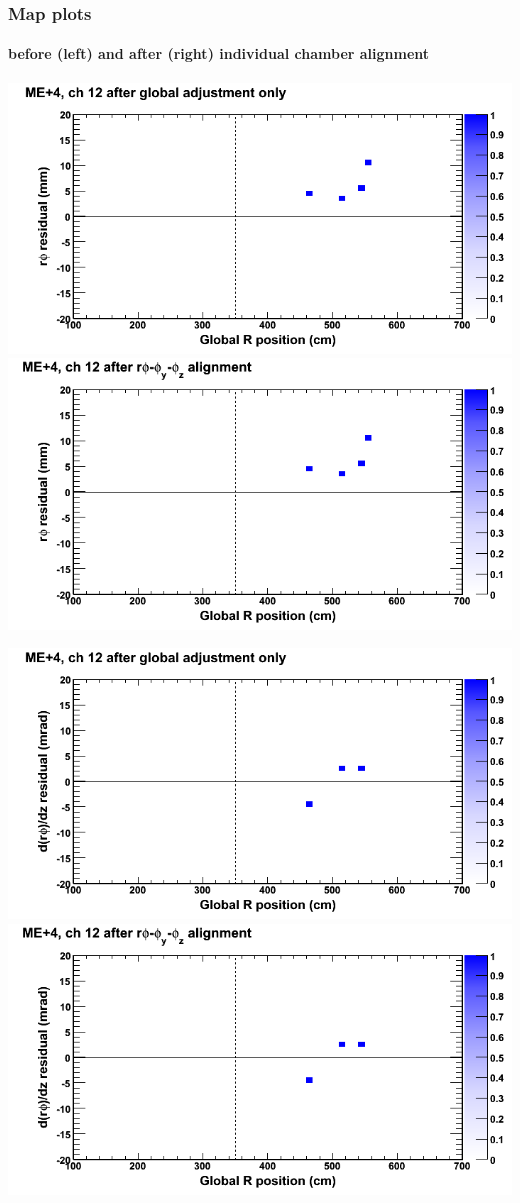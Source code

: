 \documentclass[compress]{beamer}
\begin{document}
\begin{frame}
\frametitle{Map plots}
\framesubtitle{before (left) and after (right) individual chamber alignment}
\includegraphics[width=0.5\linewidth]{ringmapplots_3dof/before_CSCvsr_mep4ch12_x.png} \includegraphics[width=0.5\linewidth]{ringmapplots_3dof/after_CSCvsr_mep4ch12_x.png}

\includegraphics[width=0.5\linewidth]{ringmapplots_3dof/before_CSCvsr_mep4ch12_dxdz.png} \includegraphics[width=0.5\linewidth]{ringmapplots_3dof/after_CSCvsr_mep4ch12_dxdz.png}
\end{frame}
\end{document}
